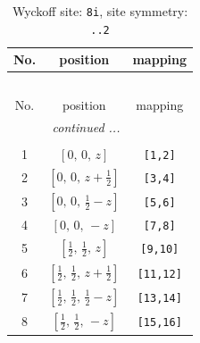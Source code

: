 \documentclass[fleqn,8pt]{jsarticle}
\begin{document}
\begin{longtable}{ccc}
\caption{Wyckoff site: {\tt 8i}, site symmetry: {\tt ..2}}
 \\
 \hline \hline
No. & position & mapping \\ \hline \endfirsthead

\multicolumn{2}{l}{\tablename\ \thetable{}} \\
 \hline \hline
No. & position & mapping \\ \hline \endhead

 \hline \hline
\multicolumn{2}{r}{\footnotesize\it continued ...} \\ \endfoot

 \hline \hline
\multicolumn{2}{r}{} \\ \endlastfoot

1 & $\left[ 0,\, 0,\, z \right]$ & {\tt [1,2]} \\ \hline
2 & $\left[ 0,\, 0,\, z + \frac{1}{2} \right]$ & {\tt [3,4]} \\ \hline
3 & $\left[ 0,\, 0,\, \frac{1}{2} - z \right]$ & {\tt [5,6]} \\ \hline
4 & $\left[ 0,\, 0,\, - z \right]$ & {\tt [7,8]} \\ \hline
5 & $\left[ \frac{1}{2},\, \frac{1}{2},\, z \right]$ & {\tt [9,10]} \\ \hline
6 & $\left[ \frac{1}{2},\, \frac{1}{2},\, z + \frac{1}{2} \right]$ & {\tt [11,12]} \\ \hline
7 & $\left[ \frac{1}{2},\, \frac{1}{2},\, \frac{1}{2} - z \right]$ & {\tt [13,14]} \\ \hline
8 & $\left[ \frac{1}{2},\, \frac{1}{2},\, - z \right]$ & {\tt [15,16]} \\
\end{longtable}
\renewcommand{\arraystretch}{1.2}
\end{document}
